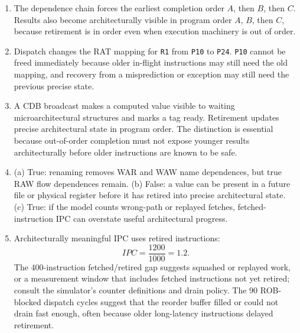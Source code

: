 \documentclass[11pt]{article}
\begin{document}
\begin{enumerate}
    \item The dependence chain forces the earliest completion order \(A\), then \(B\), then \(C\).
    Results also become architecturally visible in program order \(A\), \(B\), then \(C\), because retirement is in order even when execution machinery is out of order.

    \item Dispatch changes the RAT mapping for \texttt{R1} from \texttt{P10} to \texttt{P24}.
    \texttt{P10} cannot be freed immediately because older in-flight instructions may still need the old mapping, and recovery from a misprediction or exception may still need the previous precise state.

    \item A CDB broadcast makes a computed value visible to waiting microarchitectural structures and marks a tag ready.
    Retirement updates precise architectural state in program order.
    The distinction is essential because out-of-order completion must not expose younger results architecturally before older instructions are known to be safe.

    \item (a) True: renaming removes WAR and WAW name dependences, but true RAW flow dependences remain.
    (b) False: a value can be present in a future file or physical register before it has retired into precise architectural state.
    (c) True: if the model counts wrong-path or replayed fetches, fetched-instruction IPC can overstate useful architectural progress.

    \item Architecturally meaningful IPC uses retired instructions:
    \[
        IPC=\frac{1200}{1000}=1.2.
    \]
    The 400-instruction fetched/retired gap suggests squashed or replayed work, or a measurement window that includes fetched instructions not yet retired; consult the simulator's counter definitions and drain policy.
    The 90 ROB-blocked dispatch cycles suggest that the reorder buffer filled or could not drain fast enough, often because older long-latency instructions delayed retirement.
\end{enumerate}
\end{document}
